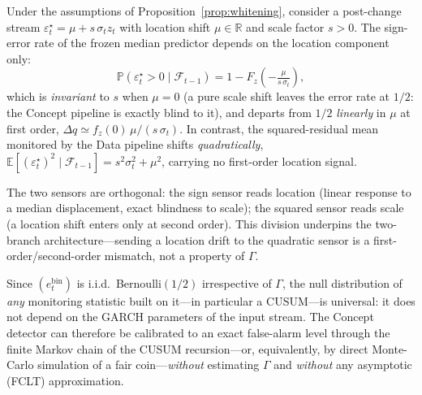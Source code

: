 \documentclass[sigconf,anonymous,review]{acmart}
\theoremstyle{acmdefinition}
\begin{document}
\begin{proposition}\label{prop:orthogonality}
    Under the assumptions of Proposition~\ref{prop:whitening}, consider a post-change stream $\varepsilon_t^{\star} = \mu + s\,\sigma_t z_t$ with location shift $\mu \in \mathbb{R}$ and scale factor $s > 0$. The sign-error rate of the frozen median predictor depends on the location component only:
    \[
        \mathbb{P}(\varepsilon_t^{\star} > 0 \mid \mathcal{F}_{t-1}) = 1 - F_z\!\left(-\tfrac{\mu}{s\,\sigma_t}\right),
    \]
    which is \emph{invariant} to $s$ when $\mu = 0$ (a pure scale shift leaves the error rate at $1/2$: the Concept pipeline is exactly blind to it), and departs from $1/2$ \emph{linearly} in $\mu$ at first order, $\Delta q \simeq f_z(0)\,\mu/(s\,\sigma_t)$. In contrast, the squared-residual mean monitored by the Data pipeline shifts \emph{quadratically}, $\mathbb{E}[(\varepsilon_t^{\star})^2 \mid \mathcal{F}_{t-1}] = s^2\sigma_t^2 + \mu^2$, carrying no first-order location signal.
\end{proposition}

\noindent The two sensors are orthogonal: the sign sensor reads location (linear response to a median displacement, exact blindness to scale); the squared sensor reads scale (a location shift enters only at second order). This division underpins the two-branch architecture---sending a location drift to the quadratic sensor is a first-order/second-order mismatch, not a property of $\Gamma$.

\begin{corollary}\label{cor:universal}
    Since $(e^{\mathrm{bin}}_t)$ is i.i.d.\ Bernoulli$(1/2)$ irrespective of $\Gamma$, the null distribution of \emph{any} monitoring statistic built on it---in particular a CUSUM---is universal: it does not depend on the GARCH parameters of the input stream. The Concept detector can therefore be calibrated to an exact false-alarm level through the finite Markov chain of the CUSUM recursion---or, equivalently, by direct Monte-Carlo simulation of a fair coin---\emph{without} estimating $\Gamma$ and \emph{without} any asymptotic (FCLT) approximation.
\end{corollary}
\end{document}
